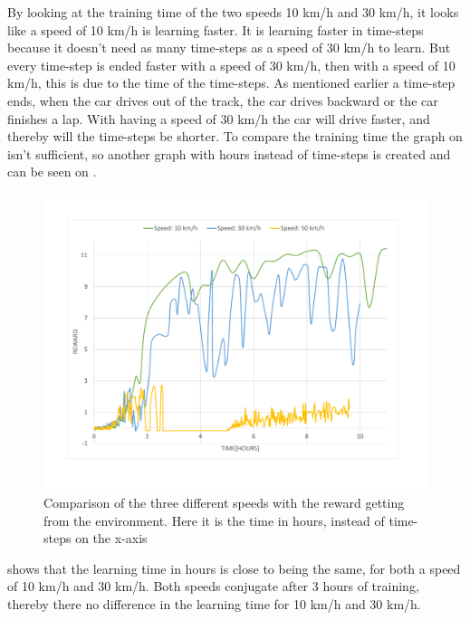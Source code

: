 By looking at the training time of the two speeds 10 km/h and 30 km/h, it looks like a speed of 10 km/h is learning faster. It is learning faster in time-steps because it doesn't need as many time-steps as a speed of 30 km/h to learn. But every time-step is ended faster with a speed of 30 km/h, then with a speed of 10 km/h, this is due to the time of the time-steps. As mentioned earlier a time-step ends, when the car drives out of the track, the car drives backward or the car finishes a lap. With having a speed of 30 km/h the car will drive faster, and thereby will the time-steps be shorter. To compare the training time the graph on  isn't sufficient, so another graph with hours instead of time-steps is created and can be seen on .

\begin{figure}[H]
	\centering
	\includegraphics[width=1\textwidth]{Figures/Result/change_of_acceleration_reward_hours_graph.pdf}
	\caption{Comparison of the three different speeds with the reward getting from the environment. Here it is the time in hours, instead of time-steps on the x-axis}
	\label{fig:change_of_acceleration_reward_hours_graph}
\end{figure}

 shows that the learning time in hours is close to being the same, for both a speed of 10 km/h and 30 km/h. Both speeds conjugate after 3 hours of training, thereby there no difference in the learning time for 10 km/h and 30 km/h.

